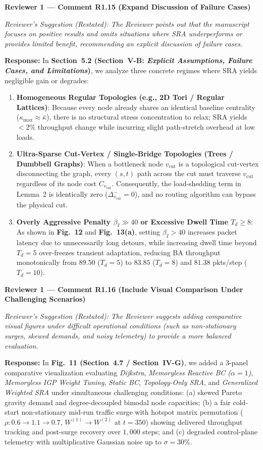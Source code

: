 \documentclass[11pt,a4paper]{article}
\newcommand{\cbox}[2]{%
  \vspace{0.6em}\noindent\textbf{#1}\par\smallskip
  \noindent\textit{Reviewer's Suggestion (Restated):} \textit{#2}\par\smallskip
}
\begin{document}
\hrulefill

\cbox{Reviewer 1 --- Comment R1.15 (Expand Discussion of Failure Cases)}{The Reviewer points out that the manuscript focuses on positive results and omits situations where SRA underperforms or provides limited benefit, recommending an explicit discussion of failure cases.}

\noindent\textbf{Response:} In \textbf{Section~5.2 (Section~V-B: \textit{Explicit Assumptions, Failure Cases, and Limitations})}, we analyze three concrete regimes where SRA yields negligible gain or degrades:
\begin{enumerate}[leftmargin=1.8em]
    \item \textbf{Homogeneous Regular Topologies (e.g., 2D Tori / Regular Lattices)}: Because every node already shares an identical baseline centrality ($\kappa_{\max} \approx \bar{\kappa}$), there is no structural stress concentration to relax; SRA yields $<2\%$ throughput change while incurring slight path-stretch overhead at low loads.
    \item \textbf{Ultra-Sparse Cut-Vertex / Single-Bridge Topologies (Trees / Dumbbell Graphs)}: When a bottleneck node $v_{\text{cut}}$ is a topological cut-vertex disconnecting the graph, every $(s,t)$ path across the cut must traverse $v_{\text{cut}}$ regardless of its node cost $C_{v_{\text{cut}}}$. Consequently, the load-shedding term in Lemma~2 is identically zero ($\Delta_{v_{\text{cut}}}^- = 0$), and no routing algorithm can bypass the physical cut.
    \item \textbf{Overly Aggressive Penalty $\beta_I \gg 40$ or Excessive Dwell Time $T_d \ge 8$}: As shown in \textbf{Fig.~12} and \textbf{Fig.~13(a)}, setting $\beta_I > 40$ increases packet latency due to unnecessarily long detours, while increasing dwell time beyond $T_d=5$ over-freezes transient adaptation, reducing BA throughput monotonically from $89.50$ ($T_d=5$) to $83.85$ ($T_d=8$) and $81.38$ pkts/step ($T_d=10$).
\end{enumerate}

\hrulefill

\cbox{Reviewer 1 --- Comment R1.16 (Include Visual Comparison Under Challenging Scenarios)}{The Reviewer suggests adding comparative visual figures under difficult operational conditions (such as non-stationary surges, skewed demands, and noisy telemetry) to provide a more balanced evaluation.}

\noindent\textbf{Response:} In \textbf{Fig.~11 (Section~4.7 / Section~IV-G)}, we added a 3-panel comparative visualization evaluating \textit{Dijkstra}, \textit{Memoryless Reactive BC ($\alpha=1$)}, \textit{Memoryless IGP Weight Tuning}, \textit{Static BC}, \textit{Topology-Only SRA}, and \textit{Generalized Weighted SRA} under simultaneous challenging conditions: (a) skewed Pareto gravity demand and degree-decoupled bimodal node capacities; (b) a fair cold-start non-stationary mid-run traffic surge with hotspot matrix permutation ($\rho: 0.6 \to 1.1 \to 0.7$, $W^{(1)}\to W^{(2)}$ at $t=350$) showing delivered throughput tracking and post-surge recovery over $1{,}000$ steps; and (c) degraded control-plane telemetry with multiplicative Gaussian noise up to $\sigma = 30\%$.
\end{document}
